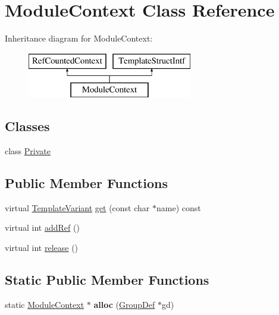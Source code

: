 \hypertarget{class_module_context}{}\section{Module\+Context Class Reference}
\label{class_module_context}
Inheritance diagram for Module\+Context\+:\begin{figure}[H]
\begin{center}
\leavevmode
\includegraphics[height=2.000000cm]{class_module_context}
\end{center}
\end{figure}
\subsection*{Classes}
\begin{DoxyCompactItemize}
\item 
class \mbox{\hyperlink{class_module_context_1_1_private}{Private}}
\end{DoxyCompactItemize}
\subsection*{Public Member Functions}
\begin{DoxyCompactItemize}
\item 
virtual \mbox{\hyperlink{class_template_variant}{Template\+Variant}} \mbox{\hyperlink{class_module_context_a230bfe9c78e887904b8eb372bb2b59fd}{get}} (const char $\ast$name) const
\item 
virtual int \mbox{\hyperlink{class_module_context_a356f888bf1ecbd08dd2a6b4a7313178e}{add\+Ref}} ()
\item 
virtual int \mbox{\hyperlink{class_module_context_aae936bd6b861311eca3bf960e0612348}{release}} ()
\end{DoxyCompactItemize}
\subsection*{Static Public Member Functions}
\begin{DoxyCompactItemize}
\item 
\mbox{\label{class_module_context_aa67bad00d37d32fdba90d5a2d5e17354}} 
static \mbox{\hyperlink{class_module_context}{Module\+Context}} $\ast$ {\bfseries alloc} (\mbox{\hyperlink{class_group_def}{Group\+Def}} $\ast$gd)
\end{DoxyCompactItemize}


